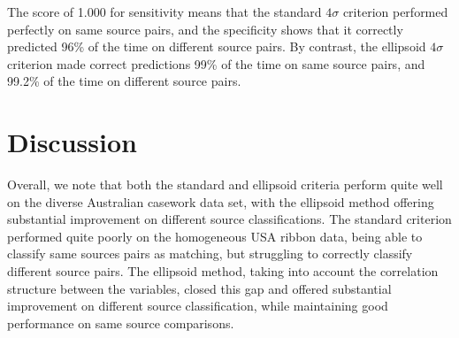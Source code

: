 \documentclass[a4paper]{article}
\begin{document}
The score of 1.000 for sensitivity means that the standard $4\sigma$ criterion performed perfectly on same source pairs, and the specificity shows that it correctly predicted 96\% of the time on different source pairs. By contrast, the ellipsoid $4\sigma$ criterion made correct predictions 99\% of the time on same source pairs, and 99.2\% of the time on different source pairs.


\section{Discussion}

Overall, we note that both the standard and ellipsoid criteria perform quite well on the diverse Australian casework data set, with the ellipsoid method offering substantial improvement on different source classifications. The standard criterion performed quite poorly on the homogeneous USA ribbon data, being able to classify same sources pairs as matching, but struggling to correctly classify different source pairs. The ellipsoid method, taking into account the correlation structure between the variables, closed this gap and offered substantial improvement on different source classification, while maintaining good performance on same source comparisons.


\end{document}
